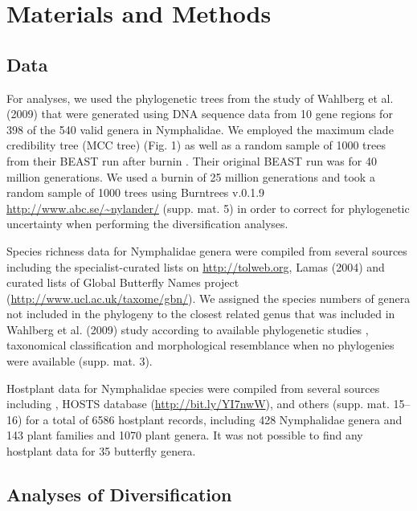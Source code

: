 \documentclass[10pt]{article}
\begin{document}
\section*{Materials and Methods}

\subsection*{Data}

For analyses, we used the phylogenetic trees from the study of Wahlberg
et al. (2009) \cite{wahlberg2009} that were generated using DNA sequence data from
10 gene regions for 398 of the 540 valid genera in Nymphalidae. We
employed the maximum clade credibility tree (MCC tree) (Fig. 1) as well
as a random sample of 1000 trees from their BEAST run after burnin
\cite{wahlberg2009}. Their original BEAST run was for 40 million generations. We
used a burnin of 25 million generations and took a random sample of 1000
trees using Burntrees v.0.1.9 \url{http://www.abc.se/~nylander/} (supp.
mat. 5) in order to correct for phylogenetic uncertainty when performing
the diversification analyses.

Species richness data for Nymphalidae genera were compiled from several
sources including the specialist-curated lists on
\url{http://tolweb.org}, Lamas (2004) \cite{lamas2004} and curated lists of
Global Butterfly Names project (\url{http://www.ucl.ac.uk/taxome/gbn/}).
We assigned the species numbers of genera not included in the phylogeny
to the closest related genus that was included in Wahlberg et al. (2009)
\cite{wahlberg2009} study according to available phylogenetic studies 
\cite{matos2013,brower2010,kodandaramaiah2010,kodandaramaiah2010a,ortiz2013,desilva2010,freitas2004,pena2006,penz1999,silva2008,pena2011,pena2010},
taxonomical classification and morphological resemblance when no
phylogenies were available (supp. mat. 3).

Hostplant data for Nymphalidae species were compiled from several
sources including \cite{ackery1988}, HOSTS database (\url{http://bit.ly/YI7nwW}),
\cite{dyer2002,beccaloni2008,janzen2009} and others (supp. mat. 15--16)
for a total of 6586
hostplant records, including 428 Nymphalidae genera and 143 plant
families and 1070 plant genera. It was not possible to find any
hostplant data for 35 butterfly genera.

\subsection*{Analyses of Diversification}
\end{document}
